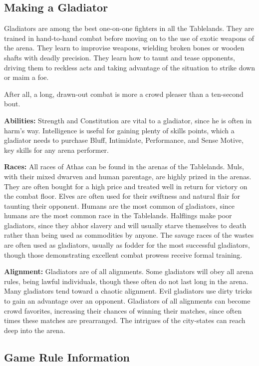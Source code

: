 \subsection{Making a Gladiator}
Gladiators are among the best one-on-one fighters in all the Tablelands. They are trained in hand-to-hand combat before moving on to the use of exotic weapons of the arena. They learn to improvise weapons, wielding broken bones or wooden shafts with deadly precision. They learn how to taunt and tease opponents, driving them to reckless acts and taking advantage of the situation to strike down or maim a foe.

After all, a long, drawn-out combat is more a crowd pleaser than a ten-second bout.

\textbf{Abilities:} Strength and Constitution are vital to a gladiator, since he is often in harm's way. Intelligence is useful for gaining plenty of skills points, which a gladiator needs to purchase Bluff, Intimidate, Performance, and Sense Motive, key skills for any arena performer.

\textbf{Races:} All races of Athas can be found in the arenas of the Tablelands. Muls, with their mixed dwarven and human parentage, are highly prized in the arenas. They are often bought for a high price and treated well in return for victory on the combat floor. Elves are often used for their swiftness and natural flair for taunting their opponent. Humans are the most common of gladiators, since humans are the most common race in the Tablelands. Halflings make poor gladiators, since they abhor slavery and will usually starve themselves to death rather than being used as commodities by anyone. The savage races of the wastes are often used as gladiators, usually as fodder for the most successful gladiators, though those demonstrating excellent combat prowess receive formal training.

\textbf{Alignment:} Gladiators are of all alignments. Some gladiators will obey all arena rules, being lawful individuals, though these often do not last long in the arena. Many gladiators tend toward a chaotic alignment. Evil gladiators use dirty tricks to gain an advantage over an opponent. Gladiators of all alignments can become crowd favorites, increasing their chances of winning their matches, since often times these matches are prearranged. The intrigues of the city-states can reach deep into the arena.

\subsection{Game Rule Information}

